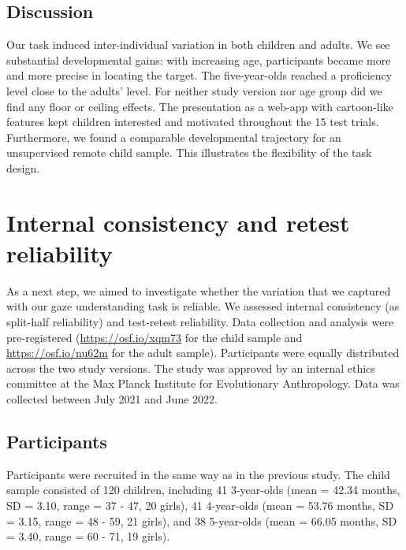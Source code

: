 \documentclass[
  man,floatsintext]{apa6}
\begin{document}
\hypertarget{discussion}{%
\subsection{Discussion}\label{discussion}}

Our task induced inter-individual variation in both children and adults.
We see substantial developmental gains: with increasing age, participants became more and more precise in locating the target.
The five-year-olds reached a proficiency level close to the adults' level.
For neither study version nor age group did we find any floor or ceiling effects.
The presentation as a web-app with cartoon-like features kept children interested and motivated throughout the 15 test trials.
Furthermore, we found a comparable developmental trajectory for an unsupervised remote child sample.
This illustrates the flexibility of the task design.

\hypertarget{internal-consistency-and-retest-reliability}{%
\section{Internal consistency and retest reliability}\label{internal-consistency-and-retest-reliability}}

As a next step, we aimed to investigate whether the variation that we captured with our gaze understanding task is reliable.
We assessed internal consistency (as split-half reliability) and test-retest reliability.
Data collection and analysis were pre-registered (\url{https://osf.io/xqm73} for the child sample and \url{https://osf.io/nu62m} for the adult sample).
Participants were equally distributed across the two study versions.
The study was approved by an internal ethics committee at the Max Planck Institute for Evolutionary Anthropology.
Data was collected between July 2021 and June 2022.

\hypertarget{participants-1}{%
\subsection{Participants}\label{participants-1}}

Participants were recruited in the same way as in the previous study.
The child sample consisted of 120 children, including 41 3-year-olds (mean = 42.34 months, SD = 3.10, range = 37 - 47, 20 girls), 41 4-year-olds (mean = 53.76 months, SD = 3.15, range = 48 - 59, 21 girls), and 38 5-year-olds (mean = 66.05 months, SD = 3.40, range = 60 - 71, 19 girls).
\end{document}
